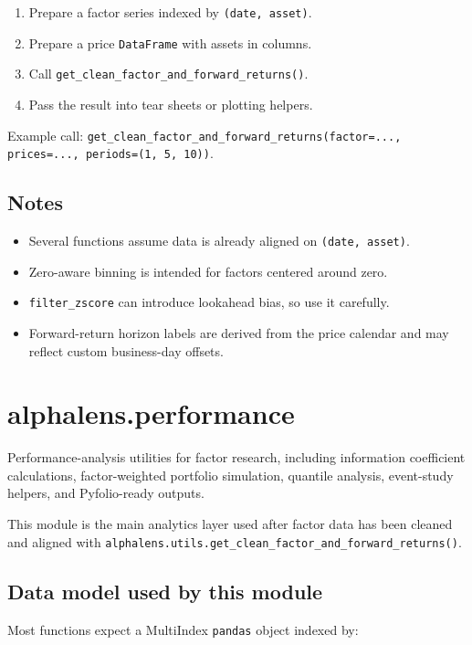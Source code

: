 \documentclass[11pt]{article}
\begin{document}
\begin{enumerate}
  \item Prepare a factor series indexed by \texttt{(date, asset)}.
  \item Prepare a price \texttt{DataFrame} with assets in columns.
  \item Call \texttt{get\_clean\_factor\_and\_forward\_returns()}.
  \item Pass the result into tear sheets or plotting helpers.
\end{enumerate}

Example call: \texttt{get\_clean\_factor\_and\_forward\_returns(factor=..., prices=..., periods=(1, 5, 10))}.

\subsection{Notes}

\begin{itemize}
  \item Several functions assume data is already aligned on \texttt{(date, asset)}.
  \item Zero-aware binning is intended for factors centered around zero.
  \item \texttt{filter\_zscore} can introduce lookahead bias, so use it carefully.
  \item Forward-return horizon labels are derived from the price calendar and may reflect custom business-day offsets.
\end{itemize}

\section{alphalens.performance}

Performance-analysis utilities for factor research, including information coefficient calculations, factor-weighted portfolio simulation, quantile analysis, event-study helpers, and Pyfolio-ready outputs.

This module is the main analytics layer used after factor data has been cleaned and aligned with \texttt{alphalens.utils.get\_clean\_factor\_and\_forward\_returns()}.

\subsection{Data model used by this module}

Most functions expect a MultiIndex \texttt{pandas} object indexed by:
\end{document}
